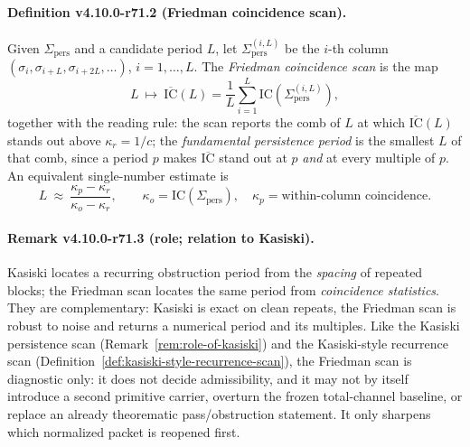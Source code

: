 \paragraph{Definition v4.10.0-r71.2 (Friedman coincidence scan).}
Given \(\Sigma_{\mathrm{pers}}\) and a candidate period \(L\), let \(\Sigma_{\mathrm{pers}}^{(i,L)}\) be the \(i\)-th column
\((\sigma_i,\sigma_{i+L},\sigma_{i+2L},\dots)\), \(i=1,\dots,L\).  The \emph{Friedman coincidence scan} is the map
\[
L\ \longmapsto\ \overline{\mathrm{IC}}(L)=\frac1L\sum_{i=1}^{L}\mathrm{IC}\!\left(\Sigma_{\mathrm{pers}}^{(i,L)}\right),
\]
together with the reading rule: the scan reports the comb of \(L\) at which \(\overline{\mathrm{IC}}(L)\) stands out above
\(\kappa_r=1/c\); the \emph{fundamental persistence period} is the smallest \(L\) of that comb, since a period \(p\) makes
\(\overline{\mathrm{IC}}\) stand out at \(p\) \emph{and} at every multiple of \(p\).  An equivalent single-number estimate is
\[
L\ \approx\ \frac{\kappa_p-\kappa_r}{\kappa_o-\kappa_r},
\qquad \kappa_o=\mathrm{IC}(\Sigma_{\mathrm{pers}}),\quad \kappa_p=\text{within-column coincidence.}
\]

\paragraph{Remark v4.10.0-r71.3 (role; relation to Kasiski).}
Kasiski locates a recurring obstruction period from the \emph{spacing} of repeated blocks; the Friedman scan locates the same
period from \emph{coincidence statistics}.  They are complementary: Kasiski is exact on clean repeats, the Friedman scan is
robust to noise and returns a numerical period and its multiples.  Like the Kasiski persistence scan
(Remark~\ref{rem:role-of-kasiski}) and the Kasiski-style recurrence scan
(Definition~\ref{def:kasiski-style-recurrence-scan}), the Friedman scan is diagnostic only: it does not decide admissibility,
and it may not by itself introduce a second primitive carrier, overturn the frozen total-channel baseline, or replace an
already theorematic pass/obstruction statement.  It only sharpens which normalized packet is reopened first.


